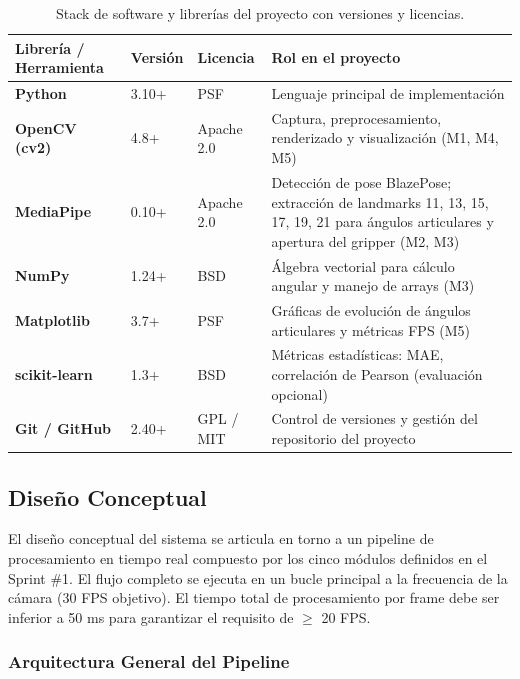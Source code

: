 \begin{table}[h!]
\centering
\label{tab:software}
\renewcommand{\arraystretch}{1.3}
\begin{tabularx}{\textwidth}{
    >{\bfseries}p{3cm}
    p{2cm}
    p{2.2cm}
    X
}
\toprule
\textbf{Librería / Herramienta} &
\textbf{Versión} &
\textbf{Licencia} &
\textbf{Rol en el proyecto} \\
\midrule
Python        & 3.10+  & PSF         & Lenguaje principal de implementación \\
\midrule
OpenCV (cv2)  & 4.8+   & Apache 2.0  & Captura, preprocesamiento, renderizado y visualización (M1, M4, M5) \cite{Bradski2000} \\
\midrule
MediaPipe     & 0.10+  & Apache 2.0  & Detección de pose BlazePose; extracción de landmarks 11, 13, 15, 17, 19, 21 para ángulos articulares y apertura del gripper (M2, M3) \cite{Bazarevskyetal2020, Lugaresietal2019} \\
\midrule
NumPy         & 1.24+  & BSD         & Álgebra vectorial para cálculo angular y manejo de arrays (M3) \\
\midrule
Matplotlib    & 3.7+   & PSF         & Gráficas de evolución de ángulos articulares y métricas FPS (M5) \\
\midrule
scikit-learn  & 1.3+   & BSD         & Métricas estadísticas: MAE, correlación de Pearson (evaluación opcional) \\
\midrule
Git / GitHub  & 2.40+  & GPL / MIT   & Control de versiones y gestión del repositorio del proyecto \\
\bottomrule
\end{tabularx}
\caption{Stack de software y librerías del proyecto con versiones y licencias.}
\end{table}

\subsection{Diseño Conceptual}

El diseño conceptual del sistema se articula en torno a un pipeline de
procesamiento en tiempo real compuesto por los cinco módulos definidos en
el Sprint \#1. El flujo completo se ejecuta en un bucle principal a la
frecuencia de la cámara (30 FPS objetivo). El tiempo total de
procesamiento por frame debe ser inferior a 50 ms para garantizar el
requisito de $\geq$ 20 FPS. \cite{Bazarevskyetal2020, Bradski2000}

\subsubsection*{Arquitectura General del Pipeline}

